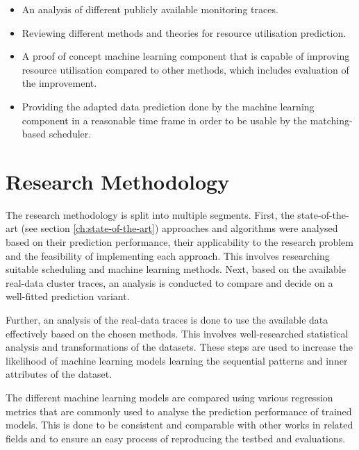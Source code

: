             \begin{itemize}
                \item An analysis of different publicly available monitoring traces.
                \item Reviewing different methods and theories for resource utilisation prediction.
                \item A proof of concept machine learning component that is capable of improving resource utilisation compared to other methods, which includes evaluation of the improvement.
                \item Providing the adapted data prediction done by the machine learning component in a reasonable time frame in order to be usable by the matching-based scheduler.
                
            \end{itemize}
            
        \section{Research Methodology}
        \label{sec:research-methodology-introduction}

            The research methodology is split into multiple segments.
            First, the state-of-the-art (see section \ref{ch:state-of-the-art}) approaches and algorithms were analysed based on their prediction performance, their applicability to the research problem and the feasibility of implementing each approach. This involves researching suitable scheduling and machine learning methods. Next, based on the available real-data cluster traces, an analysis is conducted to compare and decide on a well-fitted prediction variant.

            Further, an analysis of the real-data traces is done to use the available data effectively based on the chosen methods.
            This involves well-researched statistical analysis and transformations of the datasets. These steps are used to increase the likelihood of machine learning models learning the sequential patterns and inner attributes of the dataset.

            The different machine learning models are compared using various regression metrics that are commonly used to analyse the prediction performance of trained models. This is done to be consistent and comparable with other works in related fields and to ensure an easy process of reproducing the testbed and evaluations.

